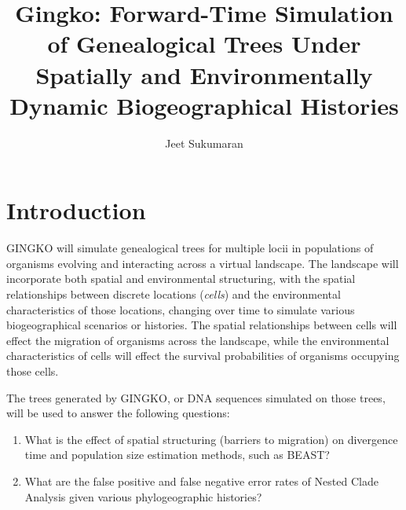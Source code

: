\documentclass[11pt]{article}
\title{Gingko: Forward-Time Simulation of Genealogical Trees Under Spatially and Environmentally Dynamic Biogeographical Histories}
\author{Jeet Sukumaran}
\date{}
\begin{document}
\maketitle
\section{Introduction}

GINGKO will simulate genealogical trees for multiple locii in populations of organisms evolving and interacting across a virtual landscape.
The landscape will incorporate both spatial and environmental structuring, with the spatial relationships between discrete locations (\textit{cells}) and the environmental characteristics of those locations, changing over time to simulate various biogeographical scenarios or histories.
The spatial relationships between cells will effect the migration of organisms across the landscape, while the environmental characteristics of cells  will effect the survival probabilities of organisms occupying those cells.

The trees generated by GINGKO, or DNA sequences simulated on those trees, will be used to answer the following questions:

\begin{enumerate}
	\item What is the effect of spatial structuring (barriers to migration) on divergence time and population size estimation methods, such as BEAST?
	\item What are the false positive and false negative error rates of Nested Clade Analysis given various phylogeographic histories?
\end{enumerate}


\end{document}
